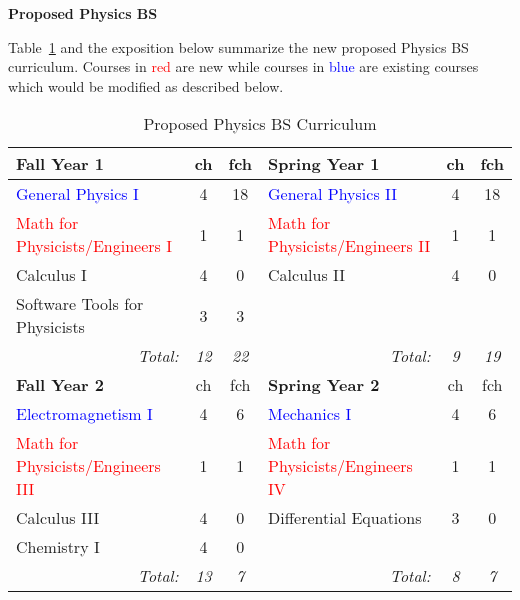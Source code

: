 \documentclass[12pt,preprint]{aastex}
\newcommand{\red}[1]{\textcolor{red}{#1}}
\newcommand{\blue}[1]{\textcolor{blue}{#1}}
\begin{document}
\vspace{2mm}
{\large \sc \textbf{Proposed Physics BS}}

Table~\ref{table:bs} and the exposition below summarize the new proposed Physics
BS curriculum.  Courses in \red{red} are new while courses in \blue{blue} are
existing courses which would be modified as described below.

\newpage

\begin{longtable}{lcclcc}
\caption{Proposed Physics BS Curriculum}\label{table:bs} \\
\hline
{\bf Fall Year 1} & {\sc ch} & {\sc fch} & {\bf Spring Year 1} & {\sc ch} & {\sc fch}  \\ 
\hline
\hline
\blue{General Physics I}                 & 4 & 18 & \blue{General Physics II} & 4 & 18 \\
\red{Math for Physicists/Engineers I} & 1 &  1 & \red{Math for Physicists/Engineers II} & 1 & 1 \\ 
Calculus I                               & 4 &  0 & Calculus II & 4 & 0 \\
Software Tools for Physicists            & 3 &  3 &             &   &   \\
\multicolumn{1}{r}{\emph{Total:}} & \emph{12} & \emph{22} &
\multicolumn{1}{r}{\emph{Total:}} & \emph{9}  & \emph{19} \\

\hline
{\bf Fall Year 2} & {\sc ch} & {\sc fch} & {\bf Spring Year 2} & {\sc ch} & {\sc fch} \\ 
\hline
\hline
\blue{Electromagnetism I}                  & 4 & 6 & \blue{Mechanics I}     & 4 & 6 \\
\red{Math for Physicists/Engineers III} & 1 & 1 & \red{Math for Physicists/Engineers IV} & 1 & 1 \\ 
Calculus III                               & 4 & 0 & Differential Equations & 3 & 0 \\
Chemistry I                                & 4 & 0 &                        &   &  \\
\multicolumn{1}{r}{\emph{Total:}} & \emph{13} & \emph{7} &
\multicolumn{1}{r}{\emph{Total:}} & \emph{8}  & \emph{7} \\


\end{longtable}
\end{document}
